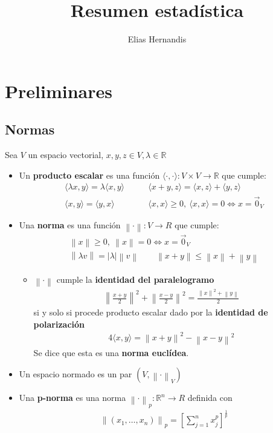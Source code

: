 \documentclass[a4paper,twocolumn]{extarticle}
\title{Resumen estadística}
\author{Elias Hernandis}
\newcommand{\R}{\mathbb{R}}
\newcommand{\norma}[1]{\left\lVert#1\right\rVert}
\newcommand{\dotprod}[1]{\langle #1 \rangle}
\begin{document}
\section{Preliminares}
\subsection{Normas}
Sea $V$ un espacio vectorial, $x, y, z \in V, \lambda \in \R$

\begin{itemize}
	\item Un \textbf{producto escalar} es una función $\dotprod{\cdot, \cdot}: V \times V \to \R$ que cumple:
	\begin{align*}
		\dotprod{\lambda x, y} = \lambda\dotprod{x,y} 
		&\qquad \dotprod{x + y, z} = \dotprod{x, z} + \dotprod{y, z}
		 \\
		\dotprod{x, y} = \dotprod{y, x}
		&\qquad \dotprod{x, x} \geq 0,\ \dotprod{x, x} = 0 \iff x = \vec{0}_V
	\end{align*}
	\item Una \textbf{norma} es una función $\norma{\cdot} : V \to R$ que cumple:
	\begin{align*}
		\norma{x} \geq 0, \ \norma{x} = 0 \iff x = \vec{0}_V \\
		\norma{\lambda v} = |\lambda| \norma{v} \qquad 
		\norma{x + y} \leq \norma{x} + \norma{y}
	\end{align*}
	\begin{itemize}
		\item $\norma{\cdot}$ cumple la \textbf{identidad del paralelogramo}
		\begin{align*}
			\norma{\frac{x+y}{2}}^2 + \norma{\frac{x- y}{2}}^2 = \frac{\norma{x}^2 + \norma{y}}{2}
		\end{align*}
		si y solo si procede producto escalar dado por la \textbf{identidad de polarización}
		\begin{align*}
			4\dotprod{x,y} = \norma{x+y}^2 - \norma{x - y}^2
		\end{align*}
		Se dice que esta es una \textbf{norma euclídea}.
	\end{itemize}
	\item Un espacio normado es un par $(V, \norma{\cdot}_V)$
	\item Una \textbf{p-norma} es una norma $\norma{\cdot}_p : \R^n \to R$ definida con
	\begin{align*}
		\norma{(x_1, \dots, x_n)}_p = \left[\sum_{j=1}^{n} x_j^p\right]^{\frac{1}{p}}
	\end{align*}

\end{itemize}
\end{document}
